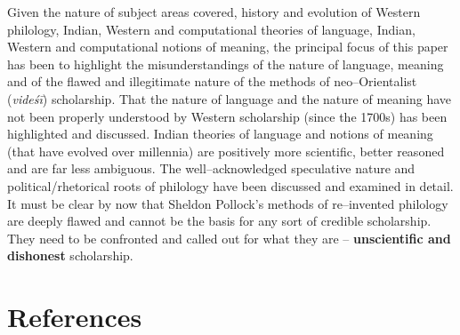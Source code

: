 Given the nature of subject areas covered, history and evolution of Western philology, Indian, Western and computational theories of language, Indian, Western and computational notions of meaning, the principal focus of this paper has been to highlight the misunderstandings of the nature of language, meaning and of the flawed and illegitimate nature of the methods of neo–Orientalist (\textit{videśī}) scholarship. That the nature of language and the nature of meaning have not been properly understood by Western scholarship (since the 1700s) has been highlighted and discussed. Indian theories of language and notions of meaning (that have evolved over millennia) are positively more scientific, better reasoned and are far less ambiguous. The well–acknowledged speculative nature and political/rhetorical roots of philology have been discussed and examined in detail. It must be clear by now that Sheldon Pollock’s methods of re–invented philology are deeply flawed and cannot be the basis for any sort of credible scholarship. They need to be confronted and called out for what they are – \textbf{unscientific and dishonest} scholarship.

\newpage


\section*{References}


